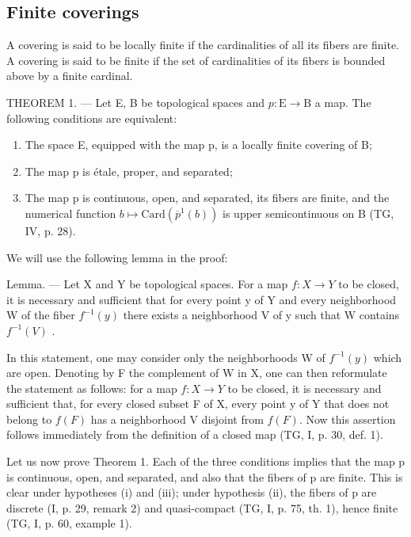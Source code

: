 \subsection{Finite coverings}

A covering is said to be locally finite if the cardinalities of all its fibers are finite. A covering is said to be finite if the set of cardinalities of its fibers is bounded above by a finite cardinal.

THEOREM 1. --- Let E, B be topological spaces and \(p\colon\mathrm{E}\to\mathrm{B}\) a map. The following conditions are equivalent:

\begin{enumerate}
\def\labelenumi{(\roman{enumi})}
\item
  The space E, equipped with the map p, is a locally finite covering of B;
\item
  The map p is étale, proper, and separated;
\item
  The map p is continuous, open, and separated, its fibers are finite, and the numerical function \(b \mapsto \text{Card}(\overline{p}^{1}(b))\) is upper semicontinuous on B (TG, IV, p. 28).
\end{enumerate}

We will use the following lemma in the proof:

Lemma. — Let X and Y be topological spaces. For a map \(f: X \to Y\) to be closed, it is necessary and sufficient that for every point y of Y and every neighborhood W of the fiber \(f^{-1}(y)\) there exists a neighborhood V of y such that W contains \(f^{-1}(V)\) .

In this statement, one may consider only the neighborhoods W of \(f^{-1}(y)\) which are open. Denoting by F the complement of W in X, one can then reformulate the statement as follows: for a map \(f: X \to Y\) to be closed, it is necessary and sufficient that, for every closed subset F of X, every point y of Y that does not belong to \(f(F)\) has a neighborhood V disjoint from \(f(F)\). Now this assertion follows immediately from the definition of a closed map (TG, I, p. 30, def. 1).

Let us now prove Theorem 1. Each of the three conditions implies that the map p is continuous, open, and separated, and also that the fibers of p are finite. This is clear under hypotheses (i) and (iii); under hypothesis (ii), the fibers of p are discrete (I, p. 29, remark 2) and quasi-compact (TG, I, p. 75, th. 1), hence finite (TG, I, p. 60, example 1).

